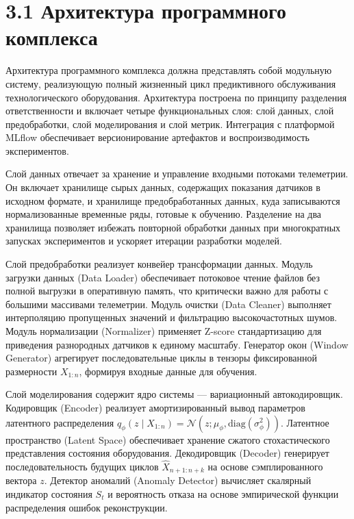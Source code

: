 \documentclass[14pt, a4paper, oneside]{extreport}
\begin{document}
\section{3.1 Архитектура программного комплекса}
\vspace{1em}

Архитектура программного комплекса должна представлять собой модульную систему, реализующую полный жизненный цикл предиктивного обслуживания технологического оборудования. Архитектура построена по принципу разделения ответственности и включает четыре функциональных слоя: слой данных, слой предобработки, слой моделирования и слой метрик. Интеграция с платформой MLflow обеспечивает версионирование артефактов и воспроизводимость экспериментов.

Слой данных отвечает за хранение и управление входными потоками телеметрии. Он включает хранилище сырых данных, содержащих показания датчиков в исходном формате, и хранилище предобработанных данных, куда записываются нормализованные временные ряды, готовые к обучению. Разделение на два хранилища позволяет избежать повторной обработки данных при многократных запусках экспериментов и ускоряет итерации разработки моделей.

Слой предобработки реализует конвейер трансформации данных. Модуль загрузки данных (Data Loader) обеспечивает потоковое чтение файлов без полной выгрузки в оперативную память, что критически важно для работы с большими массивами телеметрии. Модуль очистки (Data Cleaner) выполняет интерполяцию пропущенных значений и фильтрацию высокочастотных шумов. Модуль нормализации (Normalizer) применяет Z-score стандартизацию для приведения разнородных датчиков к единому масштабу. Генератор окон (Window Generator) агрегирует последовательные циклы в тензоры фиксированной размерности $X_{1:n}$, формируя входные данные для обучения.

Слой моделирования содержит ядро системы — вариационный автокодировщик. Кодировщик (Encoder) реализует амортизированный вывод параметров латентного распределения $q_\phi(z \mid X_{1:n}) = \mathcal{N}(z; \mu_\phi, \text{diag}(\sigma^2_\phi))$. Латентное пространство (Latent Space) обеспечивает хранение сжатого стохастического представления состояния оборудования. Декодировщик (Decoder) генерирует последовательность будущих циклов $\hat{X}_{n+1:n+k}$ на основе сэмплированного вектора $z$. Детектор аномалий (Anomaly Detector) вычисляет скалярный индикатор состояния $S_t$ и вероятность отказа на основе эмпирической функции распределения ошибок реконструкции.
\end{document}

